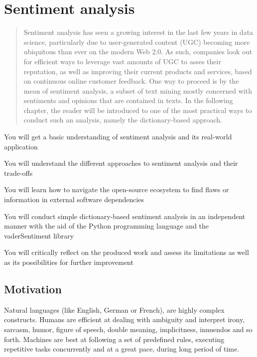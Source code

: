 	\chapter{Sentiment analysis}\label{ch:topic1}

	\begin{abstract}
		Sentiment analysis has seen a growing interest in the last few years in data science, particularly due to user-generated content (UGC) becoming more ubiquitous than ever on the modern Web 2.0. As such, companies look out for efficient ways to leverage vast amounts of UGC to asses their reputation, as well as improving their current products and services, based on continuous online customer feedback. One way to proceed is by the mean of sentiment analysis, a subset of text mining mostly concerned with sentiments and opinions that are contained in texts. In the following chapter, the reader will be introduced to one of the most practical ways to conduct such an analysis, namely the dictionary-based approach.
	\end{abstract}

	\begin{goals}
		\item You will get a basic understanding of sentiment analysis and its real-world application
		\item You will understand the different approaches to sentiment analysis and their trade-offs
		\item You will learn how to navigate the open-source ecosystem to find flaws or information in external software dependencies
		\item You will conduct simple dictionary-based sentiment analysis in an independent manner with the aid of the Python programming language and the vaderSentiment library
		\item You will critically reflect on the produced work and assess its limitations as well as its possibilities for further improvement
	\end{goals}

	\section{Motivation}
	Natural languages (like English, German or French), are highly complex constructs. Humans are efficient at dealing with ambiguity and interpret irony, sarcasm, humor, figure of speech, double meaning, implicitness, innuendos and so forth. Machines are best at following a set of predefined rules, executing repetitive tasks concurrently and at a great pace, during long period of time.

